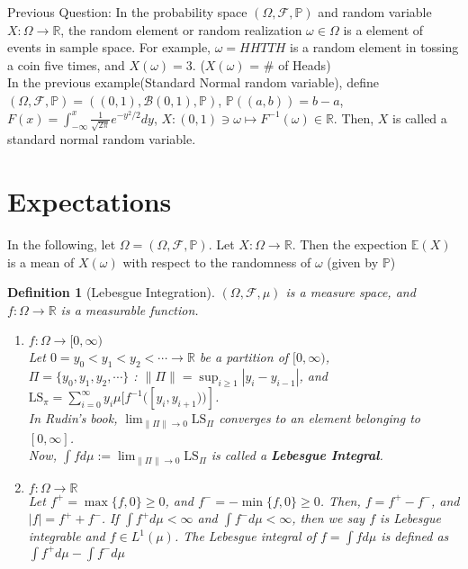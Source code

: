 \documentclass[12pt]{report}
\renewcommand{\1}{\mathbb{1}}
\theoremstyle{break}
\theoremstyle{newdef}
\newtheorem{defn}[thm]{Definition} %
\theoremstyle{remark}
\begin{document}
\vspace{5mm}
Previous Question: In the probability space $(\Omega, \mathcal{F}, \mathbb{P})$ and random variable $X : \Omega \rightarrow \mathbb{R}$, the random element or random realization $\omega \in \Omega$ is a element of events in sample space.
For example, $\omega = HHTTH$ is a random element in tossing a coin five times, and $X(\omega) = 3$. ($X(\omega)$ = \# of Heads)\\
In the previous example(Standard Normal random variable), define $(\Omega, \mathcal{F}, \mathbb{P}) = ((0,1), \mathcal{B}(0,1), \mathbb{P})$, $\mathbb{P}((a,b)) = b-a$, $F(x) = \int_{-\infty}^x \frac{1}{\sqrt{2\pi}}e^{-y^2/2}dy$, $X : (0,1) \ni \omega \mapsto F^{-1}(\omega) \in \mathbb{R}$.
Then, $X$ is called a standard normal random variable.







\section{Expectations}
In the following, let $\Omega = (\Omega, \mathcal{F}, \mathbb{P})$.
Let $X : \Omega \rightarrow \mathbb{R}$.
Then the expection $\mathbb{E}(X)$ is a mean of $X(\omega)$ with respect to the randomness of $\omega$ (given by $\mathbb{P}$)


\begin{defn}[Lebesgue Integration]
$(\Omega, \mathcal{F}, \mu)$ is a measure space, and $f : \Omega \rightarrow \mathbb{R}$ is a measurable function.
\begin{enumerate}[label = (\arabic*)]
\item $f : \Omega \rightarrow [0,\infty)$\\
Let $0 = y_0 < y_1 < y_2 < \cdots \rightarrow \mathbb{R}$ be a partition of $[0,\infty)$,\\
$\Pi = \{y_0, y_1, y_2, \cdots\}$ : $\|\Pi\| = \sup_{i\geq 1}|y_i-y_{i-1}|$, and\\
$\text{LS}_\pi = \sum_{i=0}^\infty y_i \mu[f^{-1}([y_i,y_{i+1}))]$.\\
In Rudin's book, $\lim_{\|\Pi\|\rightarrow 0} \text{LS}_\Pi$ converges to an element belonging to $[0,\infty]$.\\
Now, $\int fd\mu := \lim_{\|\Pi\|\rightarrow 0}\text{LS}_{\Pi}$ is called a \textbf{Lebesgue Integral}.

\item $f : \Omega \rightarrow \mathbb{R}$\\
Let $f^+ = \max\{f,0\} \geq 0$, and $f^- = -\min\{f,0\} \geq 0$.
Then, $f = f^+ - f^-$, and $|f| = f^+ + f^-$.
If $\int f^+d\mu < \infty$ and $\int f^- d\mu < \infty$, then we say $f$ is Lebesgue integrable and $f \in L^1(\mu)$.
The Lebesgue integral of $f = \int fd\mu$ is defined as $\int f^+ d\mu - \int f^- d\mu$
\end{enumerate}
\end{defn}
\end{document}
